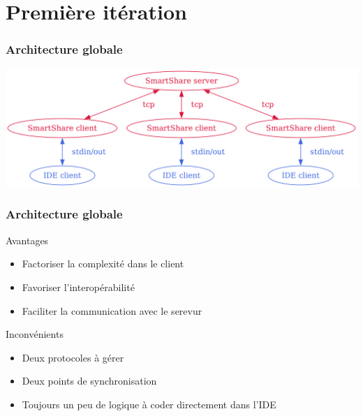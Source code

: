 \documentclass{beamer}
\begin{document}
\section{Première itération}
\begin{frame}
    \frametitle{Architecture globale}
    \includegraphics[width=\textwidth,height=0.8\textheight,keepaspectratio]{archi.png}
\end{frame}

\begin{frame}
    \frametitle{Architecture globale}

    \begin{block}{Avantages}
        \begin{itemize}
            \item Factoriser la complexité dans le client
            \item Favoriser l'interopérabilité
            \item Faciliter la communication avec le serevur
       \end{itemize}
    \end{block}

    \begin{block}{Inconvénients}
        \begin{itemize}
            \item Deux protocoles à gérer
            \item Deux points de synchronisation
            \item Toujours un peu de logique à coder directement dans l'IDE
        \end{itemize}
    \end{block}
\end{frame}
\end{document}
